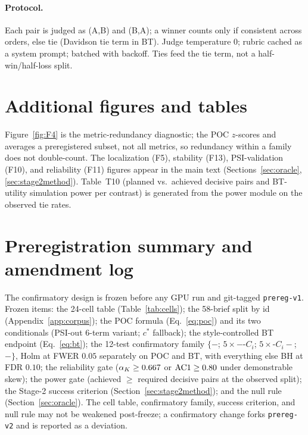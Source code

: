 \paragraph{Protocol.} Each pair is judged as (A,B) and (B,A); a winner counts only if consistent across
orders, else tie (Davidson tie term in BT). Judge temperature 0; rubric cached as a system prompt;
batched with backoff. Ties feed the tie term, not a half-win/half-loss split.

\section{Additional figures and tables}
\label{app:extra}

Figure~\ref{fig:F4} is the metric-redundancy diagnostic; the POC $z$-scores and averages a preregistered
subset, not all metrics, so redundancy within a family does not double-count. The localization (F5),
stability (F13), PSI-validation (F10), and reliability (F11) figures appear in the main text
(Sections~\ref{sec:oracle}, \ref{sec:stage2method}). Table~T10 (planned vs.\ achieved decisive pairs and
BT-utility simulation power per contrast) is generated from the power module on the observed tie rates.


\section{Preregistration summary and amendment log}
\label{app:prereg}

The confirmatory design is frozen before any GPU run and git-tagged \texttt{prereg-v1}. Frozen items:
the 24-cell table (Table~\ref{tab:cells}); the 58-brief split by id (Appendix~\ref{app:corpus}); the POC
formula (Eq.~\ref{eq:poc}) and its two conditionals (PSI-out 6-term variant; $c^{*}$ fallback); the
style-controlled BT endpoint (Eq.~\ref{eq:bt}); the 12-test confirmatory family
$\{$\FULL$-$\NEUTRAL; $5\times$\FULL$-$\LOO-$C_i$; $5\times$\AOI-$C_i-$\NEUTRAL; \FULL$-$\BEAUTY$\}$,
Holm at FWER $0.05$ separately on POC and BT, with everything else BH at FDR $0.10$; the reliability gate
($\alpha_{K}\ge0.667$ or $\mathrm{AC1}\ge0.80$ under demonstrable skew); the power gate (achieved $\ge$ required
decisive pairs at the observed split); the Stage-2 success criterion (Section~\ref{sec:stage2method});
and the null rule (Section~\ref{sec:oracle}). The cell table, confirmatory family, success criterion, and
null rule may not be weakened post-freeze; a confirmatory change forks \texttt{prereg-v2} and is reported
as a deviation.

